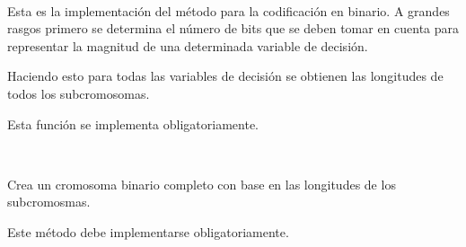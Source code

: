 \documentclass[letterpaper,10pt,english]{sphinxmanual}
\begin{document}

\begin{fulllineitems}
\label{Model/ChromosomalRepresentation/BinaryRepresentation:Model.ChromosomalRepresentation.BinaryRepresentation.calculate_length_subchromosomes}~
\begin{DUlineblock}{0em}
\item[] Esta es la implementación del método para la codificación en binario.
A grandes rasgos primero se determina el número de bits que se deben tomar en cuenta
para representar la magnitud de una determinada variable de decisión.
\item[] Haciendo esto para todas las variables de decisión se obtienen las longitudes
de todos los subcromosomas. 
\item[] Esta función se implementa obligatoriamente.
\end{DUlineblock}

\end{fulllineitems}


\begin{fulllineitems}
\label{Model/ChromosomalRepresentation/BinaryRepresentation:Model.ChromosomalRepresentation.BinaryRepresentation.create_chromosome}~
\begin{DUlineblock}{0em}
\item[] Crea un cromosoma binario completo con base en las longitudes de los subcromosmas.
\item[] Este método debe implementarse obligatoriamente.
\end{DUlineblock}

\end{fulllineitems}

\end{document}
